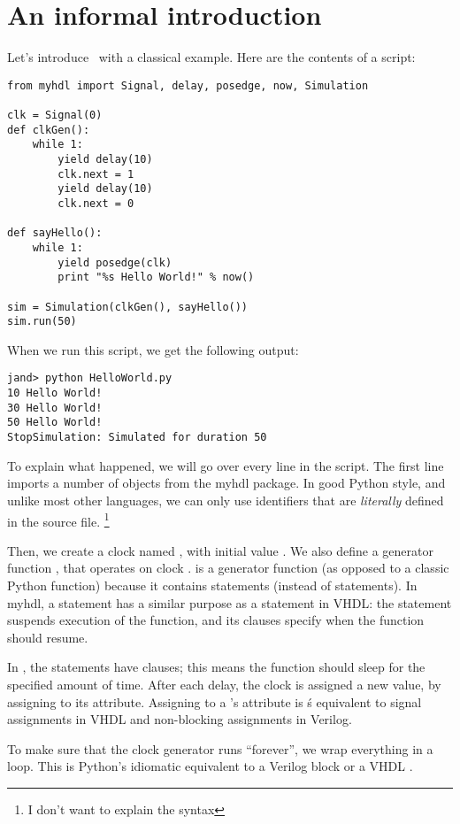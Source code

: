 \chapter{An informal introduction}

Let's introduce \myhdl\ with a classical 
example. Here are the contents of a
 script:

\begin{verbatim}
from myhdl import Signal, delay, posedge, now, Simulation

clk = Signal(0)
def clkGen():
    while 1:
        yield delay(10)
        clk.next = 1
        yield delay(10)
        clk.next = 0

def sayHello():
    while 1:
        yield posedge(clk)
        print "%s Hello World!" % now()

sim = Simulation(clkGen(), sayHello())
sim.run(50)

\end{verbatim}

When we run this script, we get the following output: 

\begin{verbatim}
jand> python HelloWorld.py
10 Hello World!
30 Hello World!
50 Hello World!
StopSimulation: Simulated for duration 50

\end{verbatim}

To explain what happened, we will go over every line in the
script. The first line imports a number of objects from the myhdl
package. In good Python style, and unlike most other languages, we can
only use identifiers that are \emph{literally} defined in the source
file. \footnote{I don't want to explain the  syntax}

Then, we create a clock  named , with initial
value . We also define a generator function ,
that operates on clock .  is a generator
function (as opposed to a classic Python function) because it contains
 statements (instead of  statements). In
myhdl, a  statement has a similar purpose as a
 statement in VHDL: the statement suspends execution of the function, 
and its clauses specify when the function should resume.

In , the  statements have 
clauses; this means the function should sleep for the specified amount
of time. After each delay, the clock is assigned a new value, by
assigning to its  attribute. Assigning to a
's  attribute is \myhdl\'s equivalent to signal
assignments in VHDL and non-blocking assignments in Verilog.

To make sure that the clock generator runs ``forever'', we wrap
everything in a  loop. This is Python's idiomatic
equivalent to a Verilog  block or a VHDL .





